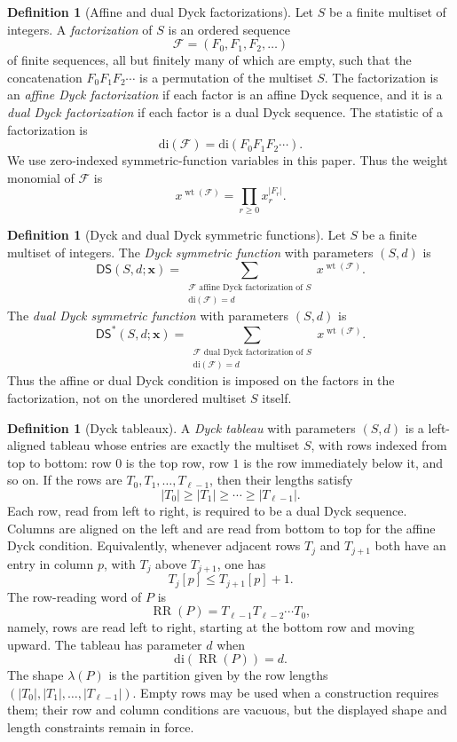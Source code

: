 \documentclass[11pt]{article}
\theoremstyle{plain}
\theoremstyle{definition}
\newtheorem{definition}[theorem]{Definition}
\theoremstyle{remark}
\newcommand{\di}{\mathrm{di}}
\newcommand{\DS}{\mathsf{DS}}
\newcommand{\DSstar}{\mathsf{DS}^{*}}
\begin{document}
\begin{definition}[Affine and dual Dyck factorizations]
\label{def:dyck-factorizations}
Let \(S\) be a finite multiset of integers.  A \emph{factorization} of \(S\)
is an ordered sequence
\[
\mathcal F=(F_0,F_1,F_2,\ldots)
\]
of finite sequences, all but finitely many of which are empty, such that the
concatenation \(F_0F_1F_2\cdots\) is a permutation of the multiset \(S\).
The factorization is an \emph{affine Dyck factorization} if each factor is an
affine Dyck sequence, and it is a \emph{dual Dyck factorization} if each factor
is a dual Dyck sequence.  The statistic of a factorization is
\[
\di(\mathcal F)=\di(F_0F_1F_2\cdots).
\]
We use zero-indexed symmetric-function variables in this paper.  Thus the
weight monomial of \(\mathcal F\) is
\[
x^{\operatorname{wt}(\mathcal F)}=\prod_{r\ge 0} x_r^{|F_r|}.
\]
\end{definition}
\begin{definition}[Dyck and dual Dyck symmetric functions]
\label{def:dyck-symmetric-functions}
Let \(S\) be a finite multiset of integers.  The
\emph{Dyck symmetric function} with parameters \((S,d)\) is
\[
\DS(S,d;\mathbf{x})
 =
\sum_{\substack{\mathcal F\text{ affine Dyck factorization of }S\\
                 \di(\mathcal F)=d}}
 x^{\operatorname{wt}(\mathcal F)}.
\]
The \emph{dual Dyck symmetric function} with parameters \((S,d)\) is
\[
\DSstar(S,d;\mathbf{x})
 =
\sum_{\substack{\mathcal F\text{ dual Dyck factorization of }S\\
                 \di(\mathcal F)=d}}
 x^{\operatorname{wt}(\mathcal F)}.
\]
Thus the affine or dual Dyck condition is imposed on the factors in the
factorization, not on the unordered multiset \(S\) itself.
\end{definition}
\begin{definition}[Dyck tableaux]
\label{def:dyck-tableau}
A \emph{Dyck tableau} with parameters \((S,d)\) is a left-aligned tableau whose
entries are exactly the multiset \(S\), with rows indexed from top to bottom:
row \(0\) is the top row, row \(1\) is the row immediately below it, and so on.
If the rows are \(T_0,T_1,\ldots,T_{\ell-1}\), then their lengths satisfy
\[
|T_0|\ge |T_1|\ge \cdots \ge |T_{\ell-1}|.
\]
Each row, read from left to right, is required to be a dual Dyck sequence.
Columns are aligned on the left and are read from bottom to top for the affine
Dyck condition.  Equivalently, whenever adjacent rows \(T_j\) and \(T_{j+1}\)
both have an entry in column \(p\), with \(T_j\) above \(T_{j+1}\), one has
\[
T_j[p]\le T_{j+1}[p]+1.
\]
The row-reading word of \(P\) is
\[
\operatorname{RR}(P)=T_{\ell-1}T_{\ell-2}\cdots T_0,
\]
namely, rows are read left to right, starting at the bottom row and moving
upward.  The tableau has parameter \(d\) when
\[
\di(\operatorname{RR}(P))=d.
\]
The shape \(\lambda(P)\) is the partition given by the row lengths
\((|T_0|,|T_1|,\ldots,|T_{\ell-1}|)\).  Empty rows may be used when a construction
requires them; their row and column conditions are vacuous, but the displayed
shape and length constraints remain in force.
\end{definition}
\end{document}
